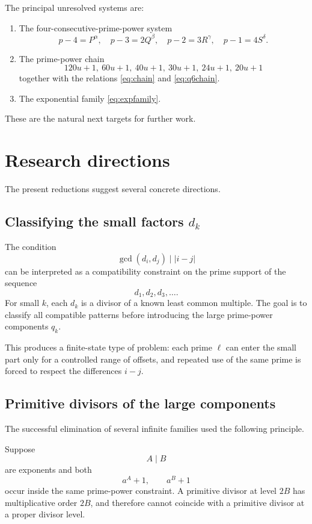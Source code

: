 \documentclass[11pt]{article}
\begin{document}
The principal unresolved systems are:

\begin{enumerate}[label=\arabic*.]
    \item The four-consecutive-prime-power system
    \[
    p-4=P^\alpha,\quad
    p-3=2Q^\beta,\quad
    p-2=3R^\gamma,\quad
    p-1=4S^\delta.
    \]
    \item The prime-power chain
    \[
    120u+1,\ 60u+1,\ 40u+1,\ 30u+1,\ 24u+1,\ 20u+1
    \]
    together with the relations \eqref{eq:chain} and \eqref{eq:q6chain}.
    \item The exponential family \eqref{eq:expfamily}.
\end{enumerate}

These are the natural next targets for further work.

\section{Research directions}

The present reductions suggest several concrete directions.

\subsection{Classifying the small factors \(d_k\)}

The condition
\[
\gcd(d_i,d_j)\mid|i-j|
\]
can be interpreted as a compatibility constraint on the prime support of the
sequence
\[
d_1,d_2,d_3,\ldots.
\]
For small \(k\), each \(d_k\) is a divisor of a known least common multiple.
The goal is to classify all compatible patterns before introducing the
large prime-power components \(q_k\).

This produces a finite-state type of problem: each prime \(\ell\) can enter
the small part only for a controlled range of offsets, and repeated use of
the same prime is forced to respect the differences \(i-j\).

\subsection{Primitive divisors of the large components}

The successful elimination of several infinite families used the following
principle.

Suppose
\[
A\mid B
\]
are exponents and both
\[
a^A+1,\qquad a^B+1
\]
occur inside the same prime-power constraint.  A primitive divisor at level
\(2B\) has multiplicative order \(2B\), and therefore cannot coincide with a
primitive divisor at a proper divisor level.
\end{document}
